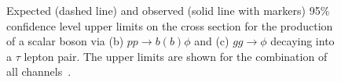 \begin{figure}[!t]
     \begin{center}
     \end{center}
  \caption{ Expected (dashed line) and observed (solid line with markers) 95\% confidence level upper limits 
	 on the cross section for the production of a scalar boson via (b) $pp \rightarrow b(b)\phi$ and
	(c) $gg \rightarrow\phi$ decaying into a $\tau$ lepton pair. 
	The upper limits are shown  for the  combination of all channels~\cite{yuppy}.}
\label{fig:mhmod_all}
\end{figure}


